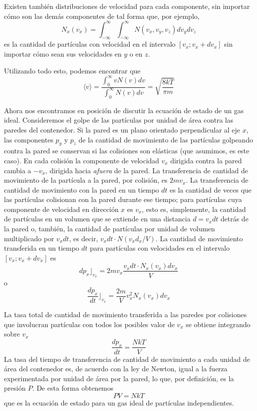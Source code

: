\documentclass[12pt,a4paper]{article}
\begin{document}
Existen también distribuciones de velocidad para cada componente, sin importar cómo son las demás componentes de tal forma que, por ejemplo,
\[ N_{x}(v_{x})= \int _{-\infty}^{\infty} \int _{-\infty}^{\infty} N(v_{x},v_{y},v_{z})dv_{y}dv_{z} \]
es la cantidad de partículas con velocidad en el intervalo $[v_{x};v_{x}+dv_{x}]$ sin importar cómo sean sus velocidades en $y$ o en $z$.

Utilizando todo esto, podemos encontrar que
\[ \langle v \rangle = \frac{\int _{0}^{\infty} v N(v) dv}{\int _{0}^{\infty} N(v)dv} = \sqrt{\frac{8kT}{\pi m}} \]

Ahora nos encontramos en posición de discutir la ecuación de estado de un gas ideal. Consideremos el golpe de las partículas por unidad de área contra las paredes del contenedor. Si la pared es un plano orientado perpendicular al eje $x$, las componentes $p_{y}$ y $p_{z}$ de la cantidad de movimiento de las partículas golpeando contra la pared se conservan si las colisiones son elásticas (que asumimos, es este caso). En cada colisión la componente de velocidad $v_{x}$ dirigida contra la pared cambia a $-v_{x}$, dirigida hacia \emph{afuera} de la pared. La transferencia de cantidad de movimiento de la partícula a la pared, por colisión, es $2mv_{x}$. La transferencia de cantidad de movimiento con la pared en un tiempo $dt$ es la cantidad de veces que las partículas colisionan con la pared durante ese tiempo; para partículas cuya componente de velocidad en dirección $x$ es $v_{x}$, esto es, simplemente, la cantidad de partículas en un volumen que se extiende en una distancia $d=v_{x}dt$ detrás de la pared o, también, la cantidad de partículas por unidad de volumen multiplicado por $v_{x}dt$, es decir, $v_{x}dt \cdot N(v_{x}d_{x}/V)$. La cantidad de movimiento transferida en un tiempo $dt$ para partículas con velocidades en el intervalo $[v_{x};v_{x}+dv_{x}]$ es
\[ dp_{x} \rfloor_{v_{x}}=2mv_{x} \frac{v_{x} dt \cdot N_{x}(v_{x})dv_{x}}{V}\]
o
\[ \frac{dp_{x}}{dt} \rfloor_{v_{x}}=\frac{2m}{V} v_{x}^{2}N_{x}(v_{x})dv_{x} \]

La tasa total de cantidad de movimiento transferida a las paredes por colisiones que involucran partículas con todos los posibles valor de $v_{x}$ se obtiene integrando sobre $v_{x}$
\[ \frac{dp_{x}}{dt}=\frac{NkT}{V} \]
La tasa del tiempo de transferencia de cantidad de movimiento a cada unidad de área del contenedor es, de acuerdo con la ley de Newton, igual a la fuerza experimentada por unidad de área por la pared, lo que, por definición, es la presión $P$. De esta forma obtenemos
\[ PV=NkT \]
que es la ecuación de estado para un gas ideal de partículas independientes.
\end{document}
